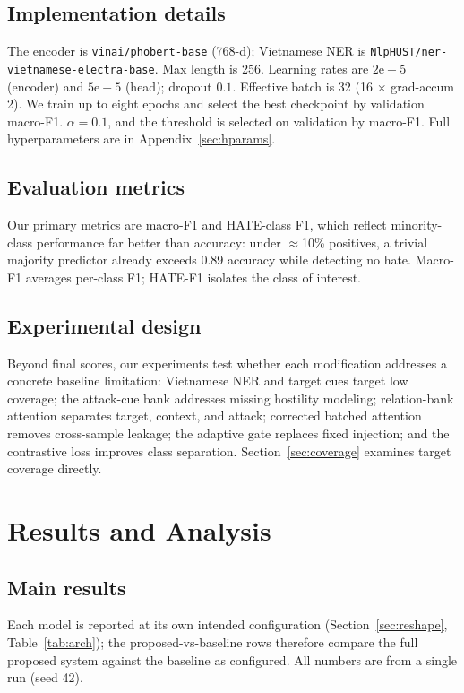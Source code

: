 \documentclass[11pt]{article}
\begin{document}
\subsection{Implementation details}
The encoder is \texttt{vinai/phobert-base} (768-d); Vietnamese NER is \texttt{NlpHUST/ner-vietnamese-electra-base}. Max length is 256. Learning rates are $2\mathrm{e}{-}5$ (encoder) and $5\mathrm{e}{-}5$ (head); dropout $0.1$. Effective batch is 32 (16 $\times$ grad-accum 2). We train up to eight epochs and select the best checkpoint by validation macro-F1. $\alpha=0.1$, and the threshold is selected on validation by macro-F1. Full hyperparameters are in Appendix~\ref{sec:hparams}.

\subsection{Evaluation metrics}
Our primary metrics are macro-F1 and HATE-class F1, which reflect minority-class performance far better than accuracy: under $\approx$10\% positives, a trivial majority predictor already exceeds 0.89 accuracy while detecting no hate. Macro-F1 averages per-class F1; HATE-F1 isolates the class of interest.

\subsection{Experimental design}
Beyond final scores, our experiments test whether each modification addresses a concrete baseline limitation: Vietnamese NER and target cues target low coverage; the attack-cue bank addresses missing hostility modeling; relation-bank attention separates target, context, and attack; corrected batched attention removes cross-sample leakage; the adaptive gate replaces fixed injection; and the contrastive loss improves class separation. Section~\ref{sec:coverage} examines target coverage directly.

\section{Results and Analysis}

\subsection{Main results}

Each model is reported at its own intended configuration (Section~\ref{sec:reshape}, Table~\ref{tab:arch}); the proposed-vs-baseline rows therefore compare the full proposed system against the baseline as configured. All numbers are from a single run (seed 42).
\end{document}
